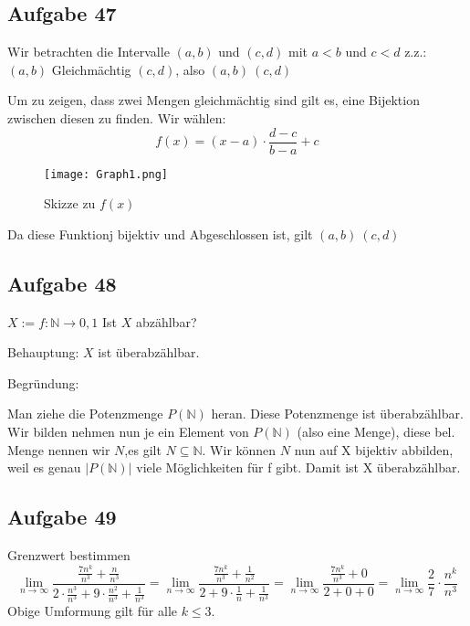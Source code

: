 \documentclass[11pt]{article}
\begin{document}
	
		\subsection{Aufgabe 47}
			Wir betrachten die Intervalle $(a,b)$ und $(c,d)$ mit $a<b$ und $c<d$
			z.z.: $(a,b)$ Gleichmächtig $(c,d)$, also $(a,b)~(c,d)$ 
			
			Um zu zeigen, dass zwei Mengen gleichmächtig sind gilt es, eine Bijektion zwischen diesen zu finden.
			Wir wählen:
			\begin{displaymath}
				f(x)=(x-a) \cdot \frac{d-c}{b-a}+c
			\end{displaymath}
			\begin{figure}[h]
				\centering
				\texttt{[image: Graph1.png]}
				\caption{Skizze zu $f(x)$}
				\label{fig:Bild}
			\end{figure}
			Da diese Funktionj bijektiv und Abgeschlossen ist, gilt $(a,b)~(c,d)$
		
		\subsection{Aufgabe 48}
			$X:={f: \mathbb{N} \rightarrow {0,1}}$
			Ist $X$ abzählbar?
			
			Behauptung: $X$	ist überabzählbar.
			
			Begründung:
				
			Man ziehe die Potenzmenge $P(\mathbb{N})$ heran. Diese Potenzmenge ist überabzählbar. Wir bilden nehmen nun je ein Element von $P(\mathbb{N})$ (also eine Menge), diese bel. Menge nennen wir $N$,es gilt $N\subseteq \mathbb{N}$.
			Wir können $N$ nun auf X bijektiv abbilden, weil es genau $\vert P(\mathbb{N})\vert$ viele Möglichkeiten für f gibt.
			Damit ist X überabzählbar.
			
		\subsection{Aufgabe 49}
			Grenzwert bestimmen
			\begin{displaymath}
				\lim \limits_{n \to \infty}	\frac{\frac{7n^k}{n^3}+\frac{n}{n^3}}{2\cdot \frac{n^3}{n^3}+9\cdot\frac{n^2}{n^3}+\frac{1}{n^3}}	
				=\lim \limits_{n \to \infty}	\frac{\frac{7n^k}{n^3}+\frac{1}{n^2}}{2+9\cdot\frac{1}{n}+\frac{1}{n^3}}
				=\lim \limits_{n \to \infty}\frac{\frac{7n^k}{n^3}+0}{2+0+0}
				=\lim \limits_{n \to \infty}\frac{2}{7}\cdot\frac{n^k}{n^3}
			\end{displaymath}	
			Obige Umformung gilt für alle $k \leq 3$.
			
\end{document}
